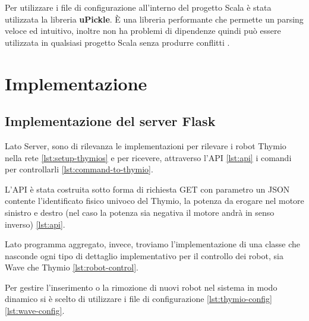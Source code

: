 \documentclass[12pt,a4paper,openright,twoside]{book}
\begin{document}
Per utilizzare i file di configurazione all'interno del progetto Scala è stata utilizzata la libreria \textbf{uPickle}. È una libreria performante che permette un parsing veloce ed intuitivo, inoltre non ha problemi di dipendenze quindi può essere utilizzata in qualsiasi progetto Scala senza produrre conflitti \cite{uPickle}.

\chapter{Implementazione}
\label{chap:implementazione}

\section{Implementazione del server Flask}

Lato Server, sono di rilevanza le implementazioni per rilevare i robot Thymio nella rete \cref{lst:setup-thymios} e per ricevere, attraverso l'API \cref{lst:api} i comandi per controllarli \cref{lst:command-to-thymio}.



L'API è stata costruita sotto forma di richiesta GET con parametro un JSON contente l'identificato fisico univoco del Thymio, la potenza da erogare nel motore sinistro e destro (nel caso la potenza sia negativa il motore andrà in senso inverso) \cref{lst:api}.





Lato programma aggregato, invece, troviamo l'implementazione di una classe che nasconde ogni tipo di dettaglio implementativo per il controllo dei robot, sia Wave che Thymio \cref{lst:robot-control}.



Per gestire l'inserimento o la rimozione di nuovi robot nel sistema in modo dinamico si è scelto di utilizzare i file di configurazione \cref{lst:thymio-config} \cref{lst:wave-config}.
\end{document}
